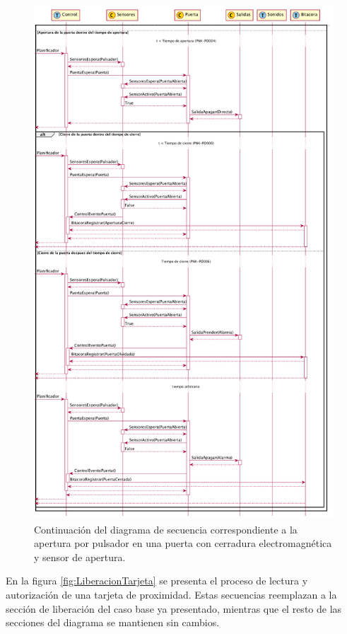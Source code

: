 \begin{figure}[ht]
	\centering
	\includegraphics[width=\textwidth]{Figures/PNK-DS002-B.pdf}
	\caption[Apertura por pulsador con cerradura electromagnética y sensor]{Continuación del diagrama de secuencia correspondiente a la apertura por pulsador en una puerta con cerradura electromagnética y sensor de apertura.}
	\label{fig:AperturaPulsador}
\end{figure}

\FloatBarrier
	
En la figura \ref{fig:LiberacionTarjeta} se presenta el proceso de lectura y autorización de una tarjeta de proximidad. Estas secuencias reemplazan a la sección de liberación del caso base ya presentado, mientras que el resto de las secciones del diagrama se mantienen sin cambios.

